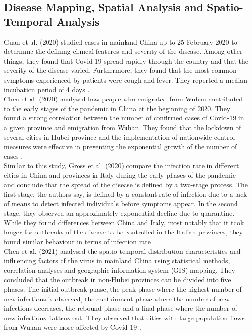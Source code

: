\subsection*{Disease Mapping, Spatial Analysis and Spatio-Temporal Analysis}
Guan et al. (2020) studied cases in mainland China up to 25 February 2020 to determine the defining clinical features and severity of the disease. Among other things, they found that Covid-19 spread rapidly through the country and that the severity of the disease varied. Furthermore, they found that the most common symptoms experienced by patients were cough and fever. They reported a median incubation period of 4 days \autocite[][]{guan2020clinical}. \\
Chen et al. (2020) analysed how people who emigrated from Wuhan contributed to the early stages of the pandemic in China at the beginning of 2020. They found a strong correlation between the number of confirmed cases of Covid-19 in a given province and emigration from Wuhan. They found that the lockdown of several cities in Hubei province and the implementation of nationwide control measures were effective in preventing the exponential growth of the number of cases \autocite[][]{chen2020distribution}. \\
Similar to this study, Gross et al. (2020) compare the infection rate in different cities in China and provinces in Italy during the early phases of the pandemic and conclude that the spread of the disease is defined by a two-stage process. The first stage, the authors say, is defined by a constant rate of infection due to a lack of means to detect infected individuals before symptoms appear. In the second stage, they observed an approximately exponential decline due to quarantine. While they found differences between China and Italy, most notably that it took longer for outbreaks of the disease to be controlled in the Italian provinces, they found similar behaviour in terms of infection rate \autocite[][]{gross2020spatio}. \\
Chen et al. (2021) analysed the spatio-temporal distribution characteristics and influencing factors of the virus in mainland China using statistical methods, correlation analyses and geographic information system (GIS) mapping. They concluded that the outbreak in non-Hubei provinces can be divided into five phases. The initial outbreak phase, the peak phase where the highest number of new infections is observed, the containment phase where the number of new infections decreases, the rebound phase and a final phase where the number of new infections flattens out. They observed that cities with large population flows from Wuhan were more affected by Covid-19 \autocite[][]{chen2021spatio}. \\
